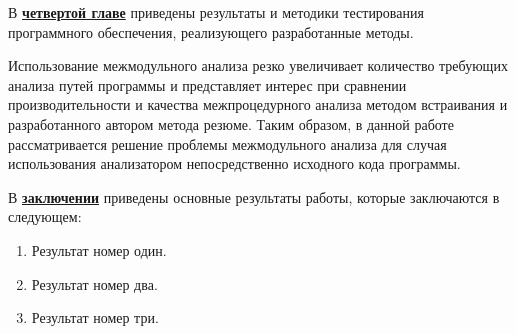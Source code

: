 В \underline{\textbf{четвертой главе}} приведены результаты и методики тестирования программного обеспечения, реализующего разработанные методы.

Использование межмодульного анализа резко увеличивает количество требующих анализа путей программы и представляет интерес при сравнении производительности и качества межпроцедурного анализа методом встраивания и разработанного автором метода резюме. Таким образом, в данной работе рассматривается решение проблемы межмодульного анализа для случая использования анализатором непосредственно исходного кода программы.


В \underline{\textbf{заключении}} приведены основные результаты работы, которые заключаются в следующем:
\begin{enumerate}
 \item Результат номер один.
 \item Результат номер два.
 \item Результат номер три.
\end{enumerate}


\renewcommand{\refname}{\large Публикации автора по теме диссертации}
\insertbiblioauthor                          %
